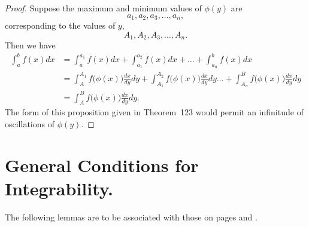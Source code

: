 \documentclass[a4paper,12pt]{book}[2004/02/16]
\providecommand{\colorbox}[2]{#2}
\newcommand{\correction}[2]{\colorbox{corr}{#1}}
\providecommand{\hyperlink}[2]{#2}
\providecommand{\hypertarget}[2]{#2}
\theoremstyle{ilemma}
\theoremstyle{itheorem}
\theoremstyle{iother}
\theoremstyle{icorollary}
\theoremstyle{numcorollary}
\theoremstyle{idefinition}
\begin{document}
\begin{proof}
Suppose the maximum and minimum values of
$\phi(y)$ are
\[
  a_1,a_2,a_3,\ldots,a_n,
\]
corresponding to the values of $y$,
\[
  A_1,A_2,A_3,\ldots,A_n.
\]
Then we have
\begin{align*}
   \int_{a }^{b } f(x)dx
&= \int_{a }^{a_1} f(x)dx
 + \int_{a_1}^{a_2} f(x)dx+\ldots
 + \int_{a_n}^{b } f(x)dx
\\
&= \int_{A }^{A_1} f\big(\phi(x)\text{\correction{$\big)$}{}} \frac{dx}{dy}dy
 + \int_{A_1}^{A_2} f\big(\phi(x)\text{\correction{$\big)$}{}} \frac{dx}{dy}dy \ldots
 + \int_{A_n}^{B } f\big(\phi(x)\text{\correction{$\big)$}{}} \frac{dx}{dy}dy
\\
&= \int_{A }^{B } f\big(\phi(x)\text{\correction{$\big)$}{}} \frac{dx}{dy}dy.
\end{align*}
The form of this proposition given in Theorem~\hyperlink{thm123}{123} would permit an
infinitude of oscillations of $\phi(y)$.
\end{proof}

\section{General Conditions for Integrability.}\hypertarget{chVIIIsec7}{}%

The following lemmas are to be associated with those on pages \pageref{lp155} and
\pageref{lp156}.
\end{document}
